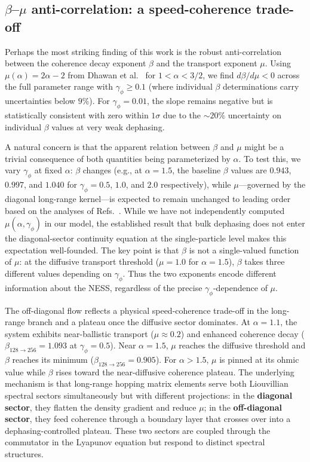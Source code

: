 \documentclass[aps,prd,twocolumn,superscriptaddress,floatfix]{revtex4-2}
\begin{document}
\subsection{$\beta$--$\mu$ anti-correlation: a speed-coherence trade-off}

Perhaps the most striking finding of this work is the robust
anti-correlation between the coherence decay exponent $\beta$ and the
transport exponent $\mu$. Using $\mu(\alpha) = 2\alpha - 2$ from
Dhawan et al.~\cite{Dhawan2024} for $1 < \alpha < 3/2$, we find
$d\beta/d\mu < 0$ across the full parameter range with
$\gamma_\phi \geq 0.1$ (where individual $\beta$ determinations carry
uncertainties below $9\%$). For $\gamma_\phi = 0.01$, the slope
remains negative but is statistically consistent with zero within
$1\sigma$ due to the $\sim 20\%$ uncertainty on individual $\beta$
values at very weak dephasing.

A natural concern is that the apparent relation between $\beta$ and
$\mu$ might be a trivial consequence of both quantities being
parameterized by $\alpha$. To test this, we vary $\gamma_\phi$ at
fixed $\alpha$: $\beta$ changes (e.g., at $\alpha = 1.5$, the baseline
$\beta$ values are $0.943$, $0.997$, and $1.040$ for
$\gamma_\phi = 0.5$, $1.0$, and $2.0$ respectively), while
$\mu$---governed by the diagonal long-range kernel---is expected to
remain unchanged to leading order based on the analyses of
Refs.~\cite{Dhawan2024,Costa2025}. While we have not independently
computed $\mu(\alpha,\gamma_\phi)$ in our model, the established
result that bulk dephasing does not enter the diagonal-sector
continuity equation at the single-particle level makes this
expectation well-founded. The key point is that $\beta$ is not a
single-valued function of $\mu$: at the diffusive transport threshold
($\mu = 1.0$ for $\alpha = 1.5$), $\beta$ takes three different values
depending on $\gamma_\phi$. Thus the two exponents encode different
information about the NESS, regardless of the precise
$\gamma_\phi$-dependence of $\mu$.

The off-diagonal flow reflects a physical speed-coherence trade-off in
the long-range branch and a plateau once the diffusive sector
dominates. At $\alpha = 1.1$, the system exhibits near-ballistic
transport ($\mu \approx 0.2$) and enhanced coherence decay
($\beta_{128\to256} = 1.093$ at $\gamma_\phi = 0.5$). Near
$\alpha = 1.5$, $\mu$ reaches the diffusive threshold and $\beta$
reaches its minimum ($\beta_{128\to256} = 0.905$). For $\alpha > 1.5$,
$\mu$ is pinned at its ohmic value while $\beta$ rises toward the
near-diffusive coherence plateau. The underlying mechanism is that
long-range hopping matrix elements serve both Liouvillian spectral
sectors simultaneously but with different projections: in the
\textbf{diagonal sector}, they flatten the density gradient and reduce
$\mu$; in the \textbf{off-diagonal sector}, they feed coherence
through a boundary layer that crosses over into a
dephasing-controlled plateau. These two sectors are coupled through
the commutator in the Lyapunov equation but respond to distinct
spectral structures.
\end{document}
